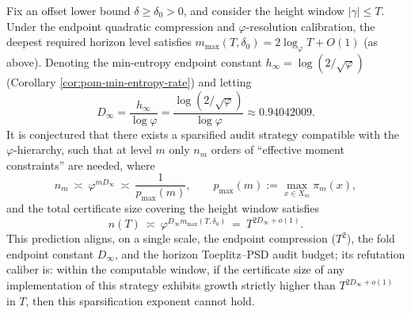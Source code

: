 \begin{conjecture}\label{conj:discussion-phi-sparsified-toeplitz-audit}
Fix an offset lower bound \(\delta\ge\delta_0>0\), and consider the height window \(|\gamma|\le T\).
Under the endpoint quadratic compression and \(\varphi\)-resolution calibration, the deepest required horizon level satisfies \(m_{\max}(T,\delta_0)=2\log_{\varphi}T+O(1)\) (as above).
Denoting the min-entropy endpoint constant \(h_\infty=\log(2/\sqrt\varphi)\) (Corollary \ref{cor:pom-min-entropy-rate}) and letting
\[
D_\infty=\frac{h_\infty}{\log\varphi}=\frac{\log(2/\sqrt\varphi)}{\log\varphi}\approx 0.94042009.
\]
It is conjectured that there exists a sparsified audit strategy compatible with the \(\varphi\)-hierarchy, such that at level \(m\) only \(n_m\) orders of ``effective moment constraints'' are needed, where
\[
n_m\ \asymp\ \varphi^{mD_\infty}\ \asymp\ \frac{1}{p_{\max}(m)},
\qquad
p_{\max}(m):=\max_{x\in X_m}\pi_m(x),
\]
and the total certificate size covering the height window satisfies
\[
n(T)\ \asymp\ \varphi^{D_\infty m_{\max}(T,\delta_0)}\ =\ T^{2D_\infty+o(1)}.
\]
This prediction aligns, on a single scale, the endpoint compression (\(T^2\)), the fold endpoint constant \(D_\infty\), and the horizon Toeplitz--PSD audit budget; its refutation caliber is: within the computable window, if the certificate size of any implementation of this strategy exhibits growth strictly higher than \(T^{2D_\infty+o(1)}\) in \(T\), then this sparsification exponent cannot hold.
\end{conjecture}

